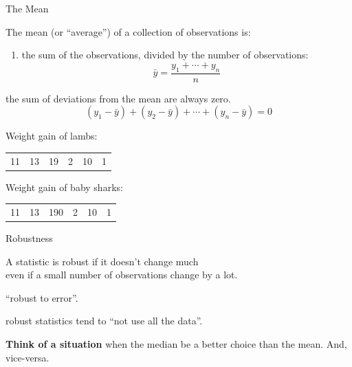 \begin{frame}{The Mean}

    The \alert{mean} (or ``average'') of a collection of observations is:
    \begin{enumerate}
        \item the sum of the observations, divided by the number of observations:
            \[
                \bar y = \frac{ y_1 + \cdots + y_n }{ n  }
            \]
    \end{enumerate}

    \pause

     the sum of deviations from the mean are always zero.
    \[
        (y_1 - \bar y) + (y_2 - \bar y) + \cdots + (y_n - \bar y) = 0
    \]

    \pause
    \vspace{2em}

     Weight gain of lambs:
    \begin{center}
        \begin{tabular}{cccccc}
            11 & 13 & 19 & 2 & 10 & 1
        \end{tabular}
    \end{center}

    \pause
    \vspace{2em}

     Weight gain of baby sharks:
    \begin{center}
        \begin{tabular}{cccccc}
            11 & 13 & 190 & 2 & 10 & 1
        \end{tabular}
    \end{center}

\end{frame}


\begin{frame}{Robustness}

    A statistic is \alert{robust} if it doesn't change much\\
    even if a small number of observations change by a lot.

    \vspace{3em}

     ``robust to error''.

    \vspace{3em}

     robust statistics tend to ``not use all the data''.

    \vspace{3em}
    \pause

    \textbf{Think of a situation} when the median be a better choice than the mean.
    And, vice-versa.

\end{frame}


